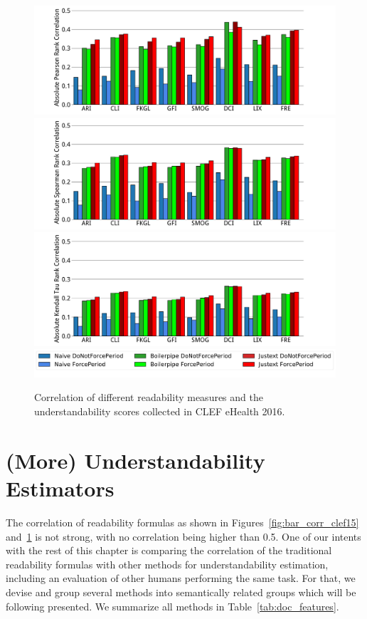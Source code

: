 \documentclass[runningheads,a4paper]{llncs}
\begin{document}
\begin{figure}[th!]
   \centering
    \includegraphics[width=1.\textwidth]{graphics/bar_corr_pearson16_values}
    \includegraphics[width=1.\textwidth]{graphics/bar_corr_spearman16_values}
    \includegraphics[width=1.\textwidth]{graphics/bar_corr_kendalltau16_values}
    \includegraphics[width=1\textwidth]{graphics/legend62}
    \caption{Correlation of different readability measures and the understandability scores collected in CLEF eHealth 2016.}
   \label{fig:bar_corr_clef16}
\end{figure}


\section{(More) Understandability Estimators}
\label{sec:proxies}

The correlation of readability formulas as shown in Figures~\ref{fig:bar_corr_clef15} and~\ref{fig:bar_corr_clef16} is not strong, with no correlation being higher than 0.5.
One of our intents with the rest of this chapter is comparing the correlation of the traditional readability formulas with other methods for understandability estimation, including an evaluation of other  humans performing the same task.
For that, we devise and group several methods into semantically related groups which will be following presented.
We summarize all methods in Table~\ref{tab:doc_features}.
\end{document}
